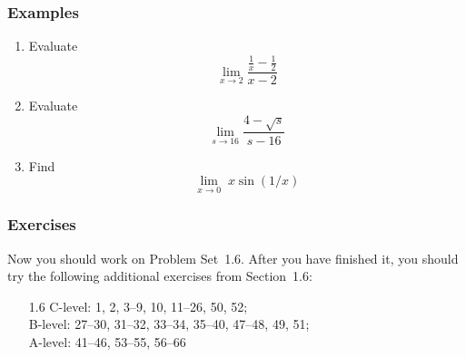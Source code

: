 \documentclass[serif,ignorenonframetext]{beamer}
\newcommand{\ds}{\displaystyle}
\begin{document}
\begin{frame}
  \frametitle{Examples}
  \begin{enumerate}
  \item Evaluate 
    \begin{displaymath}
      \lim_{x\to 2} \frac{\ds \frac{1}{x}-\frac{1}{2}}{x-2}
    \end{displaymath}
  \item Evaluate 
    \begin{displaymath}
      \lim_{s\to 16} \frac{4-\sqrt{s}}{s-16}
    \end{displaymath}
  \item Find 
    \begin{displaymath}
      \lim_{x\to 0} \; x \sin(1/x)
    \end{displaymath}
  \end{enumerate} 
\end{frame}

\begin{frame}
  \frametitle{Exercises}
  Now you should work on Problem Set~1.6.  After you have finished it,
  you should try the following additional exercises from Section~1.6:
  \begin{itemize}
  \item[1.6] C-level: 1, 2, 3--9, 10, 11--26, 50, 52; \\
    B-level: 27--30, 31--32, 33--34, 35--40, 47--48, 49, 51; \\
    A-level: 41--46, 53--55, 56--66
  \end{itemize}
\end{frame}
\end{document}
